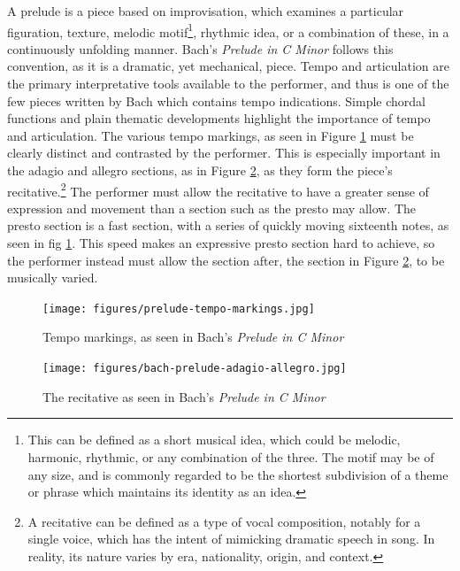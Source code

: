 A prelude is a piece based on improvisation, which examines a particular figuration, texture, melodic motif\autocite{Drabkin_2001}\footnote{This can be defined as a short musical idea, which could be melodic, harmonic, rhythmic, or any combination of the three. The motif may be of any size, and is commonly regarded to be the shortest subdivision of a theme or phrase which maintains its identity as an idea.}, rhythmic idea, or a combination of these, in a continuously unfolding manner. Bach's \textit{Prelude in C Minor} follows this convention, as it is a dramatic, yet mechanical, piece. Tempo and articulation are the primary interpretative tools available to the performer, and thus is one of the few pieces written by Bach which contains tempo indications. Simple chordal functions and plain thematic developments highlight the importance of tempo and articulation. The various tempo markings, as seen in Figure \ref{fig:prelude-tempo-markings}\autocite{Henle_2009} must be clearly distinct and contrasted by the performer. This is especially important in the adagio and allegro sections, as in Figure \ref{fig:prelude-recitative}\autocite{Henle_2009},
as they form the piece's recitative.\footnote{A recitative can be defined as a type of vocal composition, notably for a single voice, which has the intent of mimicking dramatic speech in song. In reality, its nature varies by era, nationality, origin, and context.}\autocite{Monson_Westrup_Budden_2001} The performer must allow the recitative to have a greater sense of expression and movement than a section such as the presto may allow. The presto section is a fast section, with a series of quickly moving sixteenth notes, as seen in fig \ref{fig:prelude-tempo-markings}\autocite{Henle_2009}. This speed makes an expressive presto section hard to achieve, so the performer instead must allow the section after, the section in Figure \ref{fig:prelude-recitative}\autocite{Henle_2009}, to be musically varied. 
\begin{figure}
    \centering
    \texttt{[image: figures/prelude-tempo-markings.jpg]}
    \caption{Tempo markings, as seen in Bach's \textit{Prelude in C Minor}}
    \label{fig:prelude-tempo-markings}
\end{figure}

\begin{figure}
    \centering
    \texttt{[image: figures/bach-prelude-adagio-allegro.jpg]}
    \caption{The recitative as seen in Bach's \textit{Prelude in C Minor}}
    \label{fig:prelude-recitative}
\end{figure}

